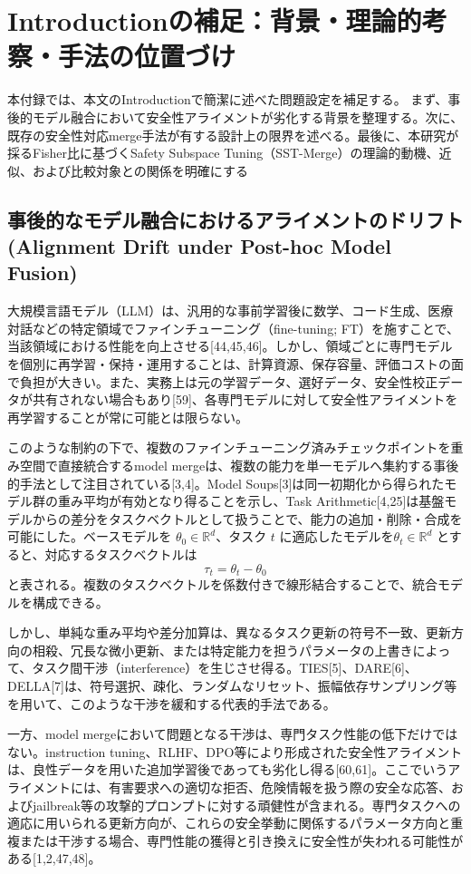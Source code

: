 \appendix

\section{Introductionの補足：背景・理論的考察・手法の位置づけ}
\label{app:introduction}
本付録では、本文のIntroductionで簡潔に述べた問題設定を補足する。
まず、事後的モデル融合において安全性アライメントが劣化する背景を整理する。次に、既存の安全性対応merge手法が有する設計上の限界を述べる。最後に、本研究が採るFisher比に基づくSafety Subspace Tuning（SST-Merge）の理論的動機、近似、および比較対象との関係を明確にする

\subsection{事後的なモデル融合におけるアライメントのドリフト(Alignment Drift under Post-hoc Model Fusion)}
大規模言語モデル（LLM）は、汎用的な事前学習後に数学、コード生成、医療対話などの特定領域でファインチューニング（fine-tuning; FT）を施すことで、当該領域における性能を向上させる[44,45,46]。しかし、領域ごとに専門モデルを個別に再学習・保持・運用することは、計算資源、保存容量、評価コストの面で負担が大きい。また、実務上は元の学習データ、選好データ、安全性校正データが共有されない場合もあり[59]、各専門モデルに対して安全性アライメントを再学習することが常に可能とは限らない。

このような制約の下で、複数のファインチューニング済みチェックポイントを重み空間で直接統合するmodel mergeは、複数の能力を単一モデルへ集約する事後的手法として注目されている[3,4]。Model Soups[3]は同一初期化から得られたモデル群の重み平均が有効となり得ることを示し、Task Arithmetic[4,25]は基盤モデルからの差分をタスクベクトルとして扱うことで、能力の追加・削除・合成を可能にした。ベースモデルを
\(\theta_0 \in \mathbb{R}^d\)、タスク \(t\) に適応したモデルを\(\theta_t \in \mathbb{R}^d\) とすると、対応するタスクベクトルは
\[
\tau_t = \theta_t - \theta_0
\]
と表される。複数のタスクベクトルを係数付きで線形結合することで、統合モデルを構成できる。

しかし、単純な重み平均や差分加算は、異なるタスク更新の符号不一致、更新方向の相殺、冗長な微小更新、または特定能力を担うパラメータの上書きによって、タスク間干渉（interference）を生じさせ得る。TIES[5]、DARE[6]、DELLA[7]は、符号選択、疎化、ランダムなリセット、振幅依存サンプリング等を用いて、このような干渉を緩和する代表的手法である。

一方、model mergeにおいて問題となる干渉は、専門タスク性能の低下だけではない。instruction tuning、RLHF、DPO等により形成された安全性アライメントは、良性データを用いた追加学習後であっても劣化し得る[60,61]。ここでいうアライメントには、有害要求への適切な拒否、危険情報を扱う際の安全な応答、およびjailbreak等の攻撃的プロンプトに対する頑健性が含まれる。専門タスクへの適応に用いられる更新方向が、これらの安全挙動に関係するパラメータ方向と重複または干渉する場合、専門性能の獲得と引き換えに安全性が失われる可能性がある[1,2,47,48]。


